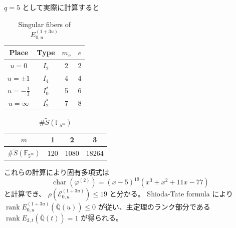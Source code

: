 \documentclass{classes/mybeamer}
\DeclareMathOperator{\rank}{rank}
\DeclareMathOperator{\chara}{char}
\begin{document}
\begin{frame}
    $q=5$ として実際に計算すると
    \begin{table}[ht]
        \centering
        \caption{Singular fibers of $E_{0,u}^{(1 + 3u)}$}
        \begin{tabular}{|c|c|c|c|}
            \hline
            Place            & Type    & $m_v$ & $e$ \\
            \hline
            $u=0$            & $I_2$   & 2     & 2   \\
            $u=\pm 1$        & $I_4$   & 4     & 4   \\
            $u=-\frac{1}{3}$ & $I_0^*$ & 5     & 6   \\
            $u=\infty$       & $I_2^*$ & 7     & 8   \\
            \hline
        \end{tabular}
        \label{tab:E_{0,u}^{(1 + 3u)}}
    \end{table}

    \begin{table}[ht]
        \centering
        \caption{$\# \tilde{S}(\mathbb{F}_{5^{m}})$}
        \begin{tabular}{|c|c|c|c|}
            \hline
            $m$                              & 1   & 2    & 3     \\
            \hline
            $\# \tilde{S}(\mathbb{F}_{5^m})$ & 120 & 1080 & 18264 \\
            \hline
        \end{tabular}
        \label{tab:tm}
    \end{table}
    これらの計算により固有多項式は
    \begin{equation*}
        \chara(\varphi^{(2)}) = (x - 5)^{19}(x^{3} + x^{2} + 11 x - 77)
    \end{equation*}
    と計算でき、 $\rho(\mathcal{E}_{0,u}^{(1 + 3u)}) \leq 19$ と分かる。
    Shioda-Tate formula により $\rank E_{0,u}^{(1 + 3u)}(\overline{\mathbb{Q}}(u)) \leq 0$ が従い、主定理のランク部分である $\rank E_{2,t}(\overline{\mathbb{Q}}(t)) = 1$ が得られる。
\end{frame}
\end{document}
